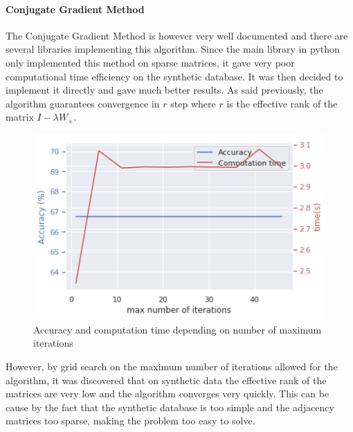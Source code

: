 \documentclass{article}
\theoremstyle{definition}
\begin{document}
\paragraph{Conjugate Gradient Method}
The Conjugate Gradient Method is however very well documented\cite{nesterov_lectures_2018} and there are several libraries implementing this algorithm. Since the main library in python\cite{jones2016scipy} only implemented this method on sparse matrices, it gave very poor computational time efficiency on the synthetic database. It was then decided to implement it directly and gave much better results. As said previously, the algorithm guarantees convergence in $r$ step where $r$ is the effective rank of the matrix $I-\lambda W_\times$. 
\begin{figure}[!htb]
	\centering
	\includegraphics[width=0.7\linewidth]{data/conj_grad/acc_time_fct_iter.png}
	\caption{Accuracy and computation time depending on number of maximum iterations}
\end{figure}
However, by grid search on the maximum number of iterations allowed for the algorithm, it was discovered that on synthetic data the effective rank of the matrices are very low and the algorithm converges very quickly. This can be cause by the fact that the synthetic database is too simple and the adjacency matrices too sparse, making the problem too easy to solve.
\end{document}
